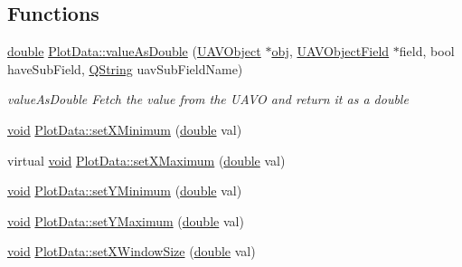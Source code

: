 \subsection*{Functions}
\begin{DoxyCompactItemize}
\item 
\hyperlink{_super_l_u_support_8h_a8956b2b9f49bf918deed98379d159ca7}{double} \hyperlink{group___scope_plugin_ga7a54fec6758e8641d8baaefca4deddc9}{Plot\-Data\-::value\-As\-Double} (\hyperlink{class_u_a_v_object}{U\-A\-V\-Object} $\ast$\hyperlink{glext_8h_a0c0d4701a6c89f4f7f0640715d27ab26}{obj}, \hyperlink{class_u_a_v_object_field}{U\-A\-V\-Object\-Field} $\ast$field, bool have\-Sub\-Field, \hyperlink{group___u_a_v_objects_plugin_gab9d252f49c333c94a72f97ce3105a32d}{Q\-String} uav\-Sub\-Field\-Name)
\begin{DoxyCompactList}\small\item\em value\-As\-Double Fetch the value from the U\-A\-V\-O and return it as a double \end{DoxyCompactList}\item 
\hyperlink{group___u_a_v_objects_plugin_ga444cf2ff3f0ecbe028adce838d373f5c}{void} \hyperlink{group___scope_plugin_ga8352ce6b7eb9118afa04e021fbba40cc}{Plot\-Data\-::set\-X\-Minimum} (\hyperlink{_super_l_u_support_8h_a8956b2b9f49bf918deed98379d159ca7}{double} val)
\item 
virtual \hyperlink{group___u_a_v_objects_plugin_ga444cf2ff3f0ecbe028adce838d373f5c}{void} \hyperlink{group___scope_plugin_ga3f195254ad44f888d45d763d819d4341}{Plot\-Data\-::set\-X\-Maximum} (\hyperlink{_super_l_u_support_8h_a8956b2b9f49bf918deed98379d159ca7}{double} val)
\item 
\hyperlink{group___u_a_v_objects_plugin_ga444cf2ff3f0ecbe028adce838d373f5c}{void} \hyperlink{group___scope_plugin_ga74a63f7995ced2fd9c0fffbde542e75b}{Plot\-Data\-::set\-Y\-Minimum} (\hyperlink{_super_l_u_support_8h_a8956b2b9f49bf918deed98379d159ca7}{double} val)
\item 
\hyperlink{group___u_a_v_objects_plugin_ga444cf2ff3f0ecbe028adce838d373f5c}{void} \hyperlink{group___scope_plugin_ga7dcfb9885435134bdde7c5006213afd8}{Plot\-Data\-::set\-Y\-Maximum} (\hyperlink{_super_l_u_support_8h_a8956b2b9f49bf918deed98379d159ca7}{double} val)
\item 
\hyperlink{group___u_a_v_objects_plugin_ga444cf2ff3f0ecbe028adce838d373f5c}{void} \hyperlink{group___scope_plugin_ga35f3eec02d08ef7ab235fe297178c265}{Plot\-Data\-::set\-X\-Window\-Size} (\hyperlink{_super_l_u_support_8h_a8956b2b9f49bf918deed98379d159ca7}{double} val)

\end{DoxyCompactItemize}
